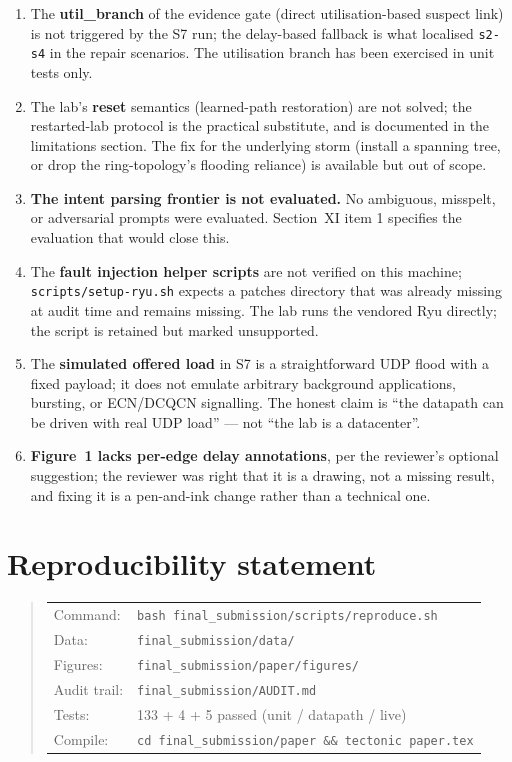 \documentclass[11pt,a4paper]{article}
\begin{document}
\begin{enumerate}
\item The \textbf{util\_branch} of the evidence gate (direct utilisation-based
  suspect link) is not triggered by the S7 run; the delay-based fallback is
  what localised \texttt{s2-s4} in the repair scenarios. The utilisation branch
  has been exercised in unit tests only.
\item The lab's \textbf{reset} semantics (learned-path restoration) are not
  solved; the restarted-lab protocol is the practical substitute, and is
  documented in the limitations section. The fix for the underlying storm
  (install a spanning tree, or drop the ring-topology's flooding reliance) is
  available but out of scope.
\item \textbf{The intent parsing frontier is not evaluated.} No ambiguous,
  misspelt, or adversarial prompts were evaluated. Section~XI item 1
  specifies the evaluation that would close this.
\item The \textbf{fault injection helper scripts} are not verified on this
  machine; \texttt{scripts/setup-ryu.sh} expects a patches directory that was
  already missing at audit time and remains missing. The lab runs the vendored
  Ryu directly; the script is retained but marked unsupported.
\item The \textbf{simulated offered load} in S7 is a straightforward UDP flood
  with a fixed payload; it does not emulate arbitrary background applications,
  bursting, or ECN/DCQCN signalling. The honest claim is ``the datapath can be
  driven with real UDP load'' --- not ``the lab is a datacenter''.
\item \textbf{Figure~1 lacks per-edge delay annotations}, per the reviewer's
  optional suggestion; the reviewer was right that it is a drawing, not a
  missing result, and fixing it is a pen-and-ink change rather than a
  technical one.
\end{enumerate}

\section{Reproducibility statement}

\begin{quote}
\begin{tabular}{@{}ll@{}}
Command: & \texttt{bash final\_submission/scripts/reproduce.sh} \\
Data: & \texttt{final\_submission/data/} \\
Figures: & \texttt{final\_submission/paper/figures/} \\
Audit trail: & \texttt{final\_submission/AUDIT.md} \\
Tests: & 133 + 4 + 5 passed (unit / datapath / live) \\
Compile: & \texttt{cd final\_submission/paper \&\& tectonic paper.tex} \\
\end{tabular}
\end{quote}
\end{document}
